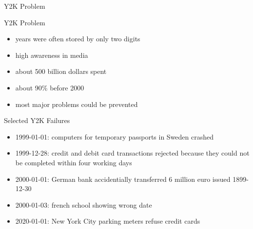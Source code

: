 \begin{frame}{Y2K Problem }
	\begin{fancycolumns}[b]
		\begin{definition}{Y2K Problem}
			\begin{itemize}
				\item years were often stored by only two digits
				\item high awareness in media
				\item about 500 billion dollars spent
				\item about 90\% before 2000
				\item most major problems could be prevented
			\end{itemize}
		\end{definition}
		\centering{}
		\nextcolumn
		\vspace{-15mm}

		\begin{example}{Selected Y2K Failures}
			\begin{itemize}
				\item<4-> 1999-01-01: computers for temporary passports in Sweden crashed
				\item<5-> 1999-12-28: credit and debit card transactions rejected because they could not be completed within four working days
				\item<2-> 2000-01-01: German bank accidentially transferred 6 million euro issued 1899-12-30
				\item<3-> 2000-01-03: french school showing wrong date
				\item<6-> 2020-01-01: New York City parking meters refuse credit cards
			\end{itemize}
		\end{example}
	\end{fancycolumns}
\end{frame}

